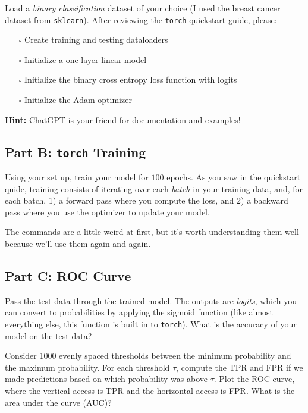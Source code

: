 \documentclass{article}
\begin{document}
Load a \textit{binary classification} dataset of your choice (I used the breast cancer dataset from \texttt{sklearn}).
After reviewing the \texttt{torch} \href{https://docs.pytorch.org/tutorials/beginner/basics/quickstart_tutorial.html}{quickstart guide}, please:

\begin{itemize}
    \item[$\square$] Create training and testing dataloaders
    \item[$\square$] Initialize a one layer linear model
    \item[$\square$] Initialize the binary cross entropy loss function with logits
    \item[$\square$] Initialize the Adam optimizer
\end{itemize}

\textbf{Hint:} ChatGPT is your friend for documentation and examples!

\subsection*{Part B: \texttt{torch} Training}

Using your set up, train your model for $100$ epochs.
As you saw in the quickstart quide, training consists of iterating over each \textit{batch} in your training data, and, for each batch, 1) a forward pass where you compute the loss, and 2) a backward pass where you use the optimizer to update your model.

The commands are a little weird at first, but it's worth understanding them well because we'll use them again and again.

\subsection*{Part C: ROC Curve}

Pass the test data through the trained model.
The outputs are \textit{logits}, which you can convert to probabilities by applying the sigmoid function (like almost everything else, this function is built in to \texttt{torch}).
What is the accuracy of your model on the test data?

Consider 1000 evenly spaced thresholds between the minimum probability and the maximum probability.
For each threshold $\tau$, compute the TPR and FPR if we made predictions based on which probability was above $\tau$.
Plot the ROC curve, where the vertical access is TPR and the horizontal access is FPR.
What is the area under the curve (AUC)?
\end{document}
